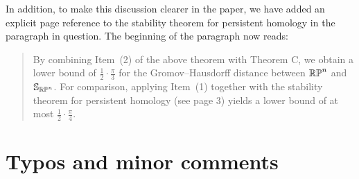 \documentclass{amsart}
\begin{document}
\begin{enumerate}
		In addition, to make this discussion clearer in the paper, we have added an explicit page reference to the stability theorem for persistent homology in the paragraph in question.
		The beginning of the paragraph now reads:

		\begin{quote}
			By combining Item~(2) of the above theorem with Theorem C, we obtain a lower bound of \(\frac{1}{2}\cdot\frac{\pi}{3}\) for the Gromov--Hausdorff distance between \(\mathbb{RP}^n\) and \(\mathbb{S}_{\mathbb{RP}^n}\).
			For comparison, applying Item~(1) together with the stability theorem for persistent homology 
			(see page 3) yields a lower bound of at most \(\frac{1}{2}\cdot\frac{\pi}{4}\).
		\end{quote}
	\end{enumerate}

	\section{Typos and minor comments}
\end{document}
